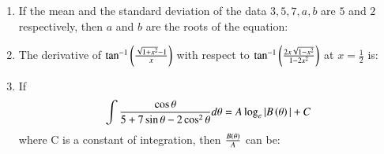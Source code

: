 \documentclass[journal,12pt,onecolumn]{IEEEtran}
\theoremstyle{remark}
\begin{document}
\begin{enumerate}
\begin{enumerate}
     \end{enumerate}
     \item If the mean and the standard deviation of the data $3,5,7,a,b$ are $5$ and $2$ respectively, then $a$ and $b$ are the roots of the equation:
     \begin{enumerate}
     \end{enumerate}
     \item The derivative of $\tan^{-1}\left(\frac{\sqrt{1+x^{2}}-1}{x}\right)$ with respect to $\tan^{-1}\left(\frac{2x\sqrt{1-x^{2}}}{1-2x^{2}}\right)$ at $x=\frac{1}{2}$ is:
     \begin{enumerate}
      \end{enumerate}
      \item If 
	      \begin{align}
		      \int \frac{\cos\theta}{5+7\sin\theta-2\cos^{2}\theta}d\theta= A\log_{e}|B\left(\theta\right)|+C
	      \end{align}
	      where C is a constant of integration, then $\frac{B\left(\theta\right)}{A}$ can be:
      \begin{enumerate}
      \end{enumerate}

\end{enumerate}
\end{document}
